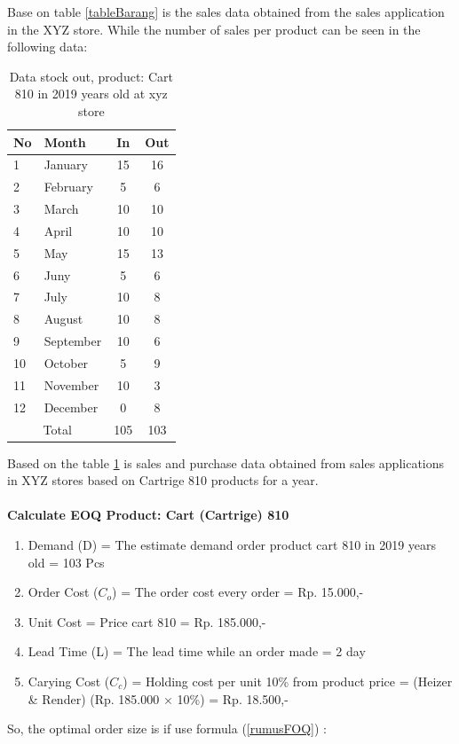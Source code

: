 \documentclass[12pt,a4paper,final]{iopart}
\begin{document}
Base on table \ref{tableBarang} is the sales data obtained from the sales application in the XYZ store. While the number of sales per product can be seen in the following data:
\begin{table}[h!]
	\centering
	\caption{\label{tableOut} Data stock out, product: Cart 810 in 2019 years old at xyz store}
	\begin{tabular}{ llcc }
		\hline
		\textbf{No} & \textbf{Month} & \textbf{In} & \textbf{Out} \\
		\hline
		1 & January & 15 & 16  \\ 
		2 & February & 5 & 6  \\ 
		3 & March & 10 & 10 \\ 
		4 & April & 10 & 10 \\ 
		5 & May & 15 & 13 \\ 
		6 & Juny & 5 & 6 \\ 
		7 & July & 10 & 8 \\ 
		8 & August & 10 & 8 \\ 
		9 & September & 10 & 6 \\ 
		10 & October & 5 & 9 \\ 
		11 & November & 10 & 3 \\ 
		12 & December & 0 & 8 \\ 
		\hline
		\multicolumn{2}{c}{Total} & {105} & {103}\\
		\hline
	\end{tabular}
\end{table}

Based on the table \ref{tableOut} is sales and purchase data obtained from sales applications in XYZ stores based on Cartrige 810 products for a year.\\ \\
\textbf{Calculate EOQ Product: Cart (Cartrige) 810}
\begin{enumerate}[label=(\alph*)]
	\item Demand (D) = The estimate demand order product cart 810 in 2019 years old = 103 Pcs
	\item Order Cost ($C_o$) = The order cost every order = Rp. 15.000,-
	\item Unit Cost = Price cart 810 = Rp. 185.000,-
	\item Lead Time (L) = The lead time while an order made = 2 day
	\item Carying Cost ($C_c$) = Holding cost per unit 10\% from product price = (Heizer \& Render) (Rp. 185.000 $\times$ 10\%) = Rp. 18.500,-
\end{enumerate}
So, the optimal order size is if use formula (\ref{rumusFOQ}) :\\
\end{document}
